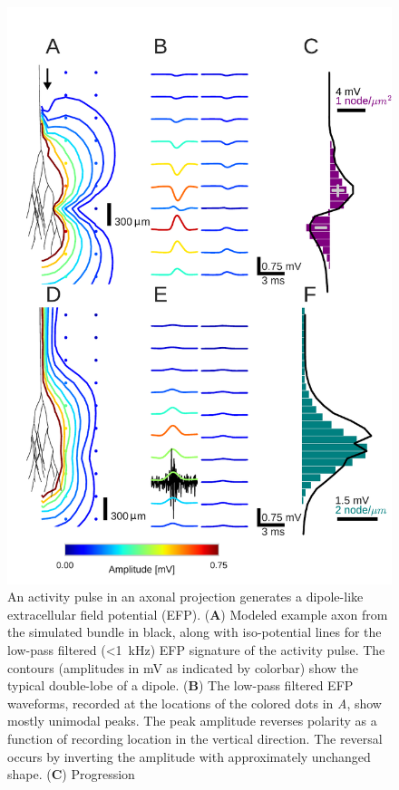 \documentclass[]{elife}
\begin{document}
\begin{figure}[htbp]
\centering
\includegraphics[height=0.65\vsize]{figs/fig_2.pdf}
\caption{\label{fig:bigtree}An activity pulse in an axonal projection
generates a dipole-like extracellular field potential (EFP).
(\textbf{A}) Modeled example axon from the simulated bundle in black,
along with iso-potential lines for the low-pass filtered
(\textless{}1~kHz) EFP signature of the activity pulse. The contours
(amplitudes in mV as indicated by colorbar) show the typical double-lobe
of a dipole. (\textbf{B}) The low-pass filtered EFP waveforms, recorded
at the locations of the colored dots in \emph{A}, show mostly unimodal
peaks. The peak amplitude reverses polarity as a function of recording
location in the vertical direction. The reversal occurs by inverting the
amplitude with approximately unchanged shape. (\textbf{C}) Progression
}
\end{figure}
\end{document}
